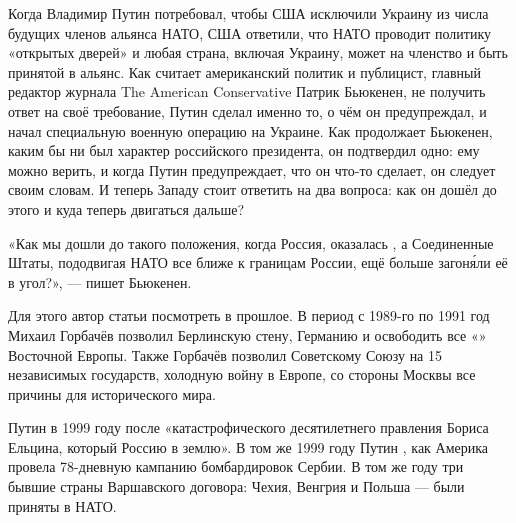 Когда Владимир Путин потребовал, чтобы США исключили Украину из числа будущих членов альянса НАТО, США ответили, что НАТО проводит политику «открытых дверей» и любая страна, включая Украину, может  на членство и быть принятой в альянс. Как считает американский политик и публицист, главный редактор журнала The American Conservative Патрик Бьюкенен, не  получить  ответ на своё требование, Путин сделал именно то, о чём он предупреждал, и начал специальную военную операцию на Украине.
Как продолжает Бьюкенен, каким бы ни был характер российского президента, он подтвердил одно: ему можно верить, и когда Путин предупреждает, что он что-то сделает, он следует своим словам. И теперь Западу стоит ответить на два вопроса: как он дошёл до этого и куда теперь двигаться дальше?

\begin{fancyquotes}
    «Как мы дошли до такого положения, когда Россия, оказалась  , а Соединенные Штаты, пододвигая НАТО все ближе к границам России, ещё больше загон\'{я}ли её в угол?», --- пишет Бьюкенен.
\end{fancyquotes}

Для этого автор статьи  посмотреть в прошлое. В период с 1989-го по 1991 год Михаил Горбачёв позволил  Берлинскую стену,  Германию и освободить все «» Восточной Европы. Также Горбачёв позволил Советскому Союзу  на 15 независимых государств,  холодную войну в Европе,  со стороны Москвы все причины для исторического  мира.

Путин  в 1999 году после «катастрофического десятилетнего правления Бориса Ельцина, который   Россию в землю». В том же 1999 году Путин , как Америка провела 78-дневную кампанию бомбардировок Сербии. В том же году три бывшие страны Варшавского договора: Чехия, Венгрия и Польша --- были приняты в НАТО.

